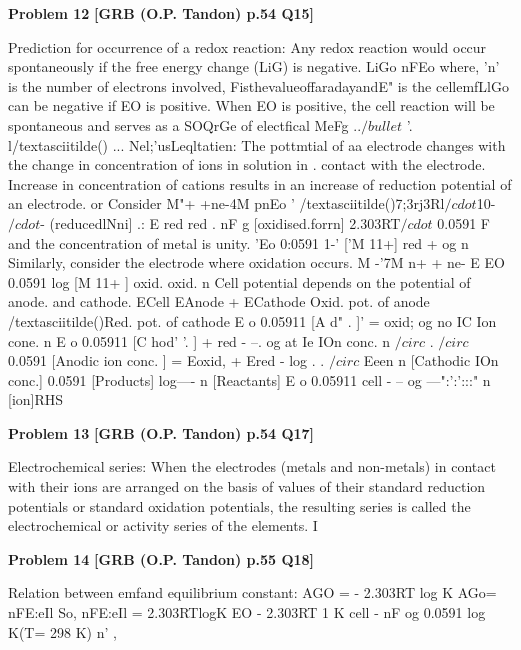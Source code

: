 \begin{problembox}
\textbf{Problem 12} \hfill \textbf{[GRB (O.P. Tandon) p.54 Q15]}
\label{q:ext-grb_all_questions-12}

Prediction for occurrence of a redox reaction: Any 
redox reaction would occur spontaneously if the free energy 
change (LiG) is negative. 
LiGo 
nFEo where, 'n' is the number of electrons involved, 
FisthevalueoffaradayandE" is the cellemfLlGo can be 
negative if EO is positive. 
When EO is positive, the cell reaction will be spontaneous and 
serves as a SOQrGe of electfical MeFg  ..$/bullet$ 
'. \underline{\hspace{1cm}}l/textasciitilde() ... Nel;'usLeqltatien: The pottmtial of aa electrode 
changes with the change in concentration of ions in solution in 
. contact with the electrode. Increase in concentration of cations 
results in an increase of reduction potential of an electrode. 
or 
Consider 
M"+ +ne-4M 
pnEo ' /textasciitilde()7;3rj3Rl$/cdot$10-$/cdot$- (reducedlNni] .: 
E red 
red 
. 
nF 
g [oxidised.forrn] 
2.303RT$/cdot$ 0.0591 
F 
and the concentration of metal is unity. 
'Eo 
0:0591 1-' ['M 11+] 
red + 
og 
n 
Similarly, consider the electrode where oxidation occurs. 
M -'7M n+ + ne-
E 
EO 
0.0591 log [M 11+ ] 
oxid. 
oxid. 
n 
Cell potential depends on the potential of anode. and cathode.\underline{\hspace{1cm}} 
ECell 
EAnode + ECathode 
Oxid. pot. of anode /textasciitilde()Red. pot. of cathode 
E o 
0.05911 
[A 
d" 
. 
]' 
= oxid; 
og 
no IC Ion cone. 
n 
E o 
0.05911 
[C hod' '. 
] 
+ 
red - --. og 
at 
Ie IOn conc. 
n 
$/circ$ . 
$/circ$ 
0.0591 
[Anodic ion conc. ] 
= Eoxid, + Ered -
log 
. . 
$/circ$ 
Eeen 
n 
[Cathodic IOn conc.] 
0.0591 
[Products] 
log----
n 
[Reactants] 
E o 
0.05911 
cell - -- og ---":':':::" 
n 
[ion]RHS
\end{problembox}

\begin{problembox}
\textbf{Problem 13} \hfill \textbf{[GRB (O.P. Tandon) p.54 Q17]}
\label{q:ext-grb_all_questions-13}

Electrochemical series: When the electrodes (metals 
and non-metals) in contact with their ions are arranged on the 
basis of values of their standard reduction potentials or standard 
oxidation potentials, the resulting series 
is 
called the 
electrochemical or activity series of the elements. 
I
\end{problembox}

\begin{problembox}
\textbf{Problem 14} \hfill \textbf{[GRB (O.P. Tandon) p.55 Q18]}
\label{q:ext-grb_all_questions-14}

Relation between emfand equilibrium constant: 
AGO = - 2.303RT log K 
AGo= nFE:eIl 
So, 
nFE:eIl = 2.303RTlogK 
EO 
- 2.303RT 1 K 
cell -
nF 
og 
0.0591 log K(T= 298 K) 
n' 
,
\end{problembox}

